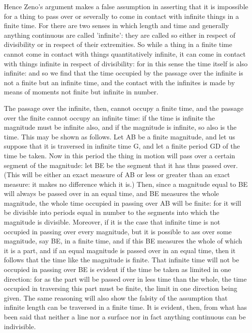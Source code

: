 Hence Zeno's argument makes a false assumption in asserting that it
is impossible for a thing to pass over or severally to come in contact
with infinite things in a finite time. For there are two senses in
which length and time and generally anything continuous are called
'infinite': they are called so either in respect of divisibility or
in respect of their extremities. So while a thing in a finite time
cannot come in contact with things quantitatively infinite, it can
come in contact with things infinite in respect of divisibility: for
in this sense the time itself is also infinite: and so we find that
the time occupied by the passage over the infinite is not a finite
but an infinite time, and the contact with the infinites is made by
means of moments not finite but infinite in number. 

The passage over the infinite, then, cannot occupy a finite time,
and the passage over the finite cannot occupy an infinite time: if
the time is infinite the magnitude must be infinite also, and if the
magnitude is infinite, so also is the time. This may be shown as follows.
Let AB be a finite magnitude, and let us suppose that it is traversed
in infinite time G, and let a finite period GD of the time be taken.
Now in this period the thing in motion will pass over a certain segment
of the magnitude: let BE be the segment that it has thus passed over.
(This will be either an exact measure of AB or less or greater than
an exact measure: it makes no difference which it is.) Then, since
a magnitude equal to BE will always be passed over in an equal time,
and BE measures the whole magnitude, the whole time occupied in passing
over AB will be finite: for it will be divisible into periods equal
in number to the segments into which the magnitude is divisible. Moreover,
if it is the case that infinite time is not occupied in passing over
every magnitude, but it is possible to ass over some magnitude, say
BE, in a finite time, and if this BE measures the whole of which it
is a part, and if an equal magnitude is passed over in an equal time,
then it follows that the time like the magnitude is finite. That infinite
time will not be occupied in passing over BE is evident if the time
be taken as limited in one direction: for as the part will be passed
over in less time than the whole, the time occupied in traversing
this part must be finite, the limit in one direction being given.
The same reasoning will also show the falsity of the assumption that
infinite length can be traversed in a finite time. It is evident,
then, from what has been said that neither a line nor a surface nor
in fact anything continuous can be indivisible. 

